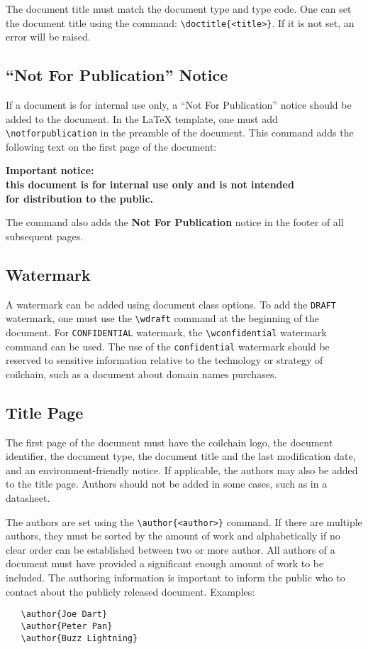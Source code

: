 \documentclass[technicalreport]{coilchain}
\begin{document}
The document title must match the document type and type code. One can set the 
document title using the command: \verb|\doctitle{<title>}|. If it is not set, 
an error will be raised.

\subsection{``Not For Publication'' Notice}\label{sec:notforpub}
If a document is for internal use only, a ``Not For Publication'' notice should 
be added to the document. In the \LaTeX{} template, one must add 
\verb|\notforpublication| in the preamble of the document. This command adds 
the following text on the first page of the document:
\begin{center}
	\textbf{\large Important notice:\\ this document is for 
		internal use only and is not intended\\ for distribution to the  
		public.}
\end{center}

The command also adds the \textbf{Not For Publication} notice in the footer of 
all subsequent pages.

\subsection{Watermark}
A watermark can be added using document class options. To add the 
\texttt{DRAFT} watermark, one must use the \verb|\wdraft| command at the beginning of the document. For 
\texttt{CONFIDENTIAL} watermark, the \verb|\wconfidential| watermark command can be 
used. The use of the \texttt{confidential} watermark should be reserved to 
sensitive information relative to the technology or strategy of coilchain, 
such as a document about domain names purchases.

\subsection{Title Page}
The first page of the document must have the coilchain logo, the document 
identifier, the document type, the document title and the last modification 
date, and an environment-friendly notice. If applicable, the authors may also 
be added to the title page. Authors should not be added in some cases, such as 
in a datasheet.

The authors are set using the \verb|\author{<author>}| command. If there are 
multiple authors, they must be sorted by the amount of work and 
alphabetically if no clear order can be established between two or more author. 
All authors of a document must have provided a significant enough amount of 
work to be included. The authoring information is important to inform the 
public who to contact about the publicly released document.
Examples:
\begin{verbatim}
   \author{Joe Dart}
   \author{Peter Pan}
   \author{Buzz Lightning}
\end{verbatim}
\end{document}
